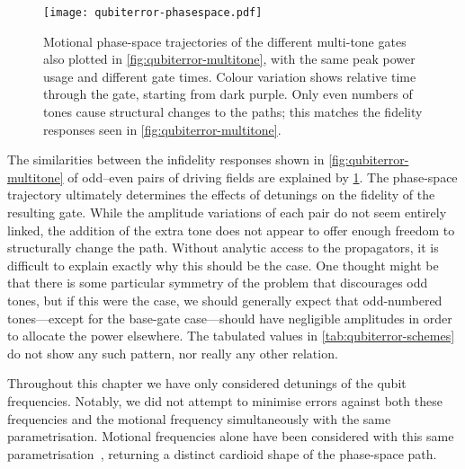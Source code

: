 \begin{figure}%
    \texttt{[image: qubiterror-phasespace.pdf]}%
    \caption[Phase-space paths during the robust multi-tone M\o lmer--S\o rensen gate]{\label{fig:qubiterror-phase}%
        Motional phase-space trajectories of the different multi-tone gates also plotted in \cref{fig:qubiterror-multitone}, with the same peak power usage and different gate times.
        Colour variation shows relative time through the gate, starting from dark purple.
        Only even numbers of tones cause structural changes to the paths; this matches the fidelity responses seen in \cref{fig:qubiterror-multitone}.%
    }%
\end{figure}

The similarities between the infidelity responses shown in \cref{fig:qubiterror-multitone} of odd--even pairs of driving fields are explained by \cref{fig:qubiterror-phase}.
The phase-space trajectory ultimately determines the effects of detunings on the fidelity of the resulting gate.
While the amplitude variations of each pair do not seem entirely linked, the addition of the extra tone does not appear to offer enough freedom to structurally change the path.
Without analytic access to the propagators, it is difficult to explain exactly why this should be the case.
One thought might be that there is some particular symmetry of the problem that discourages odd tones, but if this were the case, we should generally expect that odd-numbered tones---except for the base-gate case---should have negligible amplitudes in order to allocate the power elsewhere.
The tabulated values in \cref{tab:qubiterror-schemes} do not show any such pattern, nor really any other relation.

Throughout this chapter we have only considered detunings of the qubit frequencies.
Notably, we did not attempt to minimise errors against both these frequencies and the motional frequency simultaneously with the same parametrisation.
Motional frequencies alone have been considered with this same parametrisation~\cite{Haddadfarshi2016,Webb2018,Shapira2018}, returning a distinct cardioid shape of the phase-space path.


